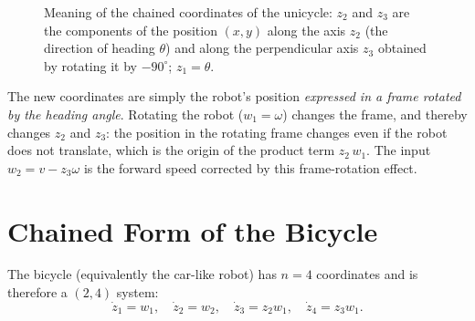 \documentclass[11pt,a4paper]{article}
\theoremstyle{definition}
\theoremstyle{plain}
\theoremstyle{remark}
\begin{document}
\begin{figure}[ht]
\centering
{}
\caption{Meaning of the chained coordinates of the unicycle: $z_2$ and $z_3$ are the components of the position $(x,y)$ along the axis $z_2$ (the direction of heading $\theta$) and along the perpendicular axis $z_3$ obtained by rotating it by $-90^\circ$; $z_1=\theta$.}
\end{figure}

\begin{intuition}
The new coordinates are simply the robot's position \emph{expressed in a frame rotated by the heading angle}. Rotating the robot ($w_1=\omega$) changes the frame, and thereby changes $z_2$ and $z_3$: the position in the rotating frame changes even if the robot does not translate, which is the origin of the product term $z_2\,w_1$. The input $w_2=v-z_3\omega$ is the forward speed corrected by this frame-rotation effect.
\end{intuition}

\section{Chained Form of the Bicycle}

The bicycle (equivalently the car-like robot) has $n=4$ coordinates and is therefore a $(2,4)$ system:
\[
 \dot z_1=w_1,\quad \dot z_2=w_2,\quad\dot z_3=z_2w_1,\quad\dot z_4=z_3w_1 .
\]
\end{document}
